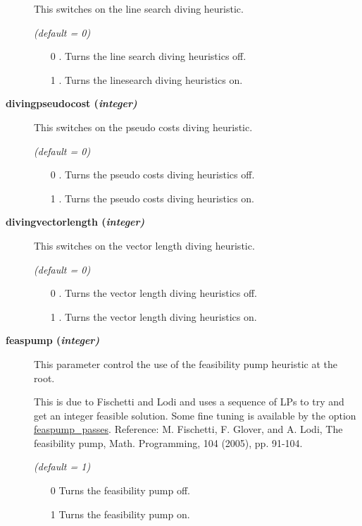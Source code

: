 \begin{description}
This switches on the line search diving heuristic.

\textsl{(default = 0)}
\begin{itemize}
\item[0] .
Turns the line search diving heuristics off.
\item[1] .
Turns the linesearch diving heuristics on.
\end{itemize}

\item[\label{divingpseudocost}\hypertarget{divingpseudocost}
{\textbf{divingpseudocost (\slshape{integer})}}]\hspace{1.0in}

This switches on the pseudo costs diving heuristic.

\textsl{(default = 0)}
\begin{itemize}
\item[0] .
Turns the pseudo costs diving heuristics off.
\item[1] .
Turns the pseudo costs diving heuristics on.
\end{itemize}

\item[\label{divingvectorlength}\hypertarget{divingvectorlength}
{\textbf{divingvectorlength (\slshape{integer})}}]\hspace{1.0in}

This switches on the vector length diving heuristic.

\textsl{(default = 0)}
\begin{itemize}
\item[0] .
Turns the vector length diving heuristics off.
\item[1] .
Turns the vector length diving heuristics on.
\end{itemize}

\item[\label{feaspump}\hypertarget{feaspump}
{\textbf{feaspump (\slshape{integer})}}]\hspace{1.0in}

This parameter control the use of the feasibility pump heuristic at the root.

This is due to Fischetti and Lodi and uses a sequence of LPs to try and get an integer feasible solution.
Some fine tuning is available by the option \hyperlink{feaspump_passes}{feaspump\_passes}.
Reference: M. Fischetti, F. Glover, and A. Lodi, The feasibility pump, Math. Programming, 104 (2005), pp. 91-104.

\textsl{(default = 1)}
\begin{itemize}
\item[0] 
Turns the feasibility pump off.
\item[1] 
Turns the feasibility pump on.
\end{itemize}


\end{description}
